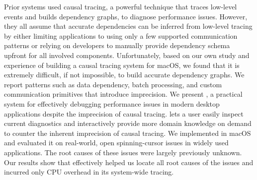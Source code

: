 Prior systems used causal tracing, a powerful technique that traces low-level
events and builds dependency graphs, to diagnose performance issues.  However,
they all assume that accurate dependencies can be inferred from low-level
tracing by either limiting applications to using only a few supported
communication patterns or relying on developers to manually provide dependency
schema upfront for all involved components.  Unfortunately, based on our own
study and experience of building a causal tracing system for macOS, we found
that it is extremely difficult, if not impossible, to build accurate dependency
graphs.  We report patterns such as data dependency, batch processing, and
custom communication primitives that introduce imprecision.  We present \xxx, a
practical system for effectively debugging performance issues in modern desktop
applications despite the imprecision of causal tracing.  \xxx lets a user
easily inspect current diagnostics and interactively provide more domain
knowledge on demand to counter the inherent imprecision of causal tracing.  We
implemented \xxx in macOS and evaluated it on \nbug real-world, open
spinning-cursor issues in widely used applications.  The root causes of these
issues were largely previously unknown.  Our results show that \xxx effectively
helped us locate all root causes of the issues and incurred only \cpuoverhead CPU
overhead in its system-wide tracing.
